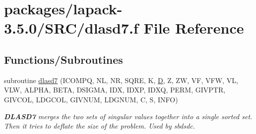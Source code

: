 \hypertarget{dlasd7_8f}{}\section{packages/lapack-\/3.5.0/\+S\+R\+C/dlasd7.f File Reference}
\label{dlasd7_8f}
\subsection*{Functions/\+Subroutines}
\begin{DoxyCompactItemize}
\item 
subroutine \hyperlink{group__auxOTHERauxiliary_ga5ec18a9b77aca48cfc490ad5022eeafe}{dlasd7} (I\+C\+O\+M\+P\+Q, N\+L, N\+R, S\+Q\+R\+E, K, \hyperlink{odrpack_8h_a7dae6ea403d00f3687f24a874e67d139}{D}, Z, Z\+W, V\+F, V\+F\+W, V\+L, V\+L\+W, A\+L\+P\+H\+A, B\+E\+T\+A, D\+S\+I\+G\+M\+A, I\+D\+X, I\+D\+X\+P, I\+D\+X\+Q, P\+E\+R\+M, G\+I\+V\+P\+T\+R, G\+I\+V\+C\+O\+L, L\+D\+G\+C\+O\+L, G\+I\+V\+N\+U\+M, L\+D\+G\+N\+U\+M, C, S, I\+N\+F\+O)
\begin{DoxyCompactList}\small\item\em {\bfseries D\+L\+A\+S\+D7} merges the two sets of singular values together into a single sorted set. Then it tries to deflate the size of the problem. Used by sbdsdc. \end{DoxyCompactList}\end{DoxyCompactItemize}
